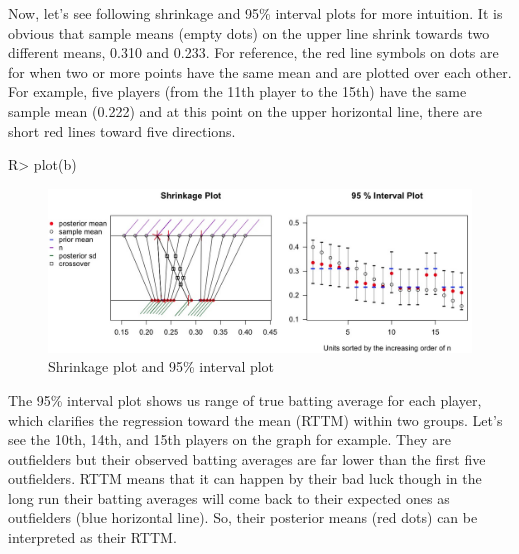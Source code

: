 \documentclass[article]{jss}
\begin{document}
Now, let's see following shrinkage and 95\% interval plots for more intuition. It is obvious that sample means (empty dots) on the upper line shrink towards two different means, 0.310 and 0.233. For reference, the red line symbols on dots are for when two or more points have the same mean and are plotted over each other. For example, five players (from the 11th player to the 15th) have the same sample mean (0.222) and at this point on the upper horizontal line, there are short red lines toward five directions.

\begin{CodeChunk}
\begin{CodeInput}
R> plot(b)
\end{CodeInput}
\end{CodeChunk}
\begin{figure}[h]
\begin{center}
\includegraphics[scale=0.3]{baseball1.png}
\caption{Shrinkage plot and 95\% interval plot}
\end{center}
\end{figure}



The 95\% interval plot shows us range of true batting average for each player, which clarifies the regression toward the mean (RTTM) within two groups. Let's see the 10th, 14th, and 15th players on the graph for example. They are outfielders but their observed batting averages are far lower than the first five outfielders. RTTM means that it can happen by their bad luck though in the long run their batting averages will come back to their expected ones as outfielders (blue horizontal line). So, their posterior means (red dots) can be interpreted as their RTTM. 
\end{document}
